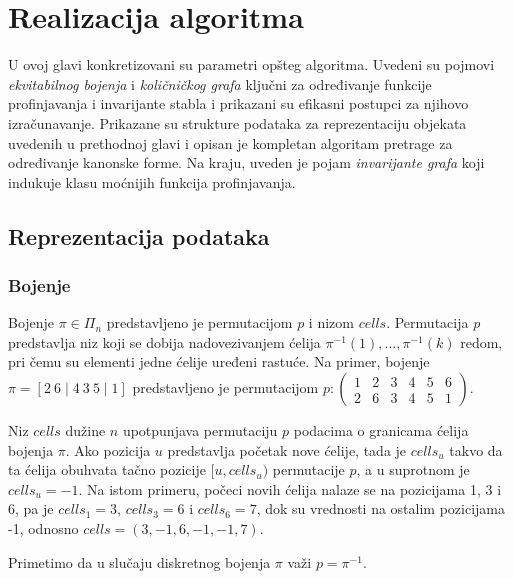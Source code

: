 \documentclass[12pt,oneside]{memoir}
\theoremstyle{definition}
\begin{document}
\chapter{Realizacija algoritma}

 U ovoj glavi konkretizovani su parametri opšteg algoritma.  Uvedeni su pojmovi
 \emph{ekvitabilnog bojenja} i \emph{količničkog grafa} ključni za određivanje
 funkcije profinjavanja i invarijante stabla i prikazani su efikasni postupci
 za njihovo izračunavanje.  Prikazane su strukture podataka za reprezentaciju
 objekata uvedenih u prethodnoj glavi i opisan je kompletan algoritam pretrage
 za određivanje kanonske forme. Na kraju, uveden je pojam \emph{invarijante
 grafa} koji indukuje klasu moćnijih funkcija profinjavanja.

 \section{Reprezentacija podataka}

  \subsection{Bojenje}

   Bojenje $\pi \in \Pi_n$ predstavljeno je permutacijom $p$ i nizom $cells$.
   Permutacija $p$ predstavlja niz koji se dobija nadovezivanjem ćelija
   $\pi^{-1}(1), \dots, \pi^{-1}(k)$ redom, pri čemu su elementi jedne ćelije
   uređeni rastuće. Na primer, bojenje $\pi = [2\ 6 \mid 4\ 3\ 5 \mid 1]$
   predstavljeno je permutacijom $p : \begin{pmatrix} 1 & 2 & 3 & 4 & 5 & 6\\ 2
   & 6 & 3 & 4 & 5 & 1 \end{pmatrix}$.

   Niz $cells$ dužine $n$ upotpunjava permutaciju $p$ podacima o granicama
   ćelija bojenja $\pi$. Ako pozicija $u$ predstavlja početak nove ćelije, tada
   je $cells_u$ takvo da ta ćelija obuhvata tačno pozicije $[u, cells_u)$
   permutacije $p$, a u suprotnom je $cells_u = -1$. Na istom primeru, počeci
   novih ćelija nalaze se na pozicijama 1, 3 i 6, pa je $cells_1 = 3$, $cells_3
   = 6$ i $cells_6 = 7$, dok su vrednosti na ostalim pozicijama -1, odnosno
   $cells = (3, -1, 6, -1, -1, 7)$.

   Primetimo da u slučaju diskretnog bojenja $\pi$ važi $p = \pi^{-1}$.
\end{document}
